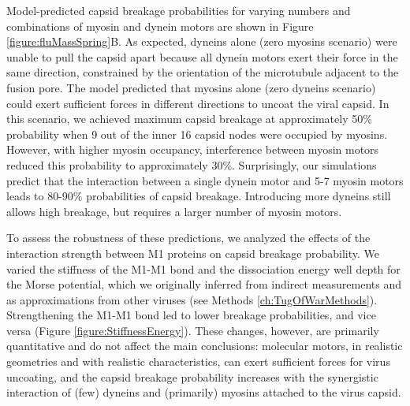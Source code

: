 Model-predicted capsid breakage probabilities for varying numbers and combinations of myosin and dynein motors are shown in Figure \ref{figure:fluMassSpring}B. As expected, dyneins alone (zero myosins scenario) were unable to pull the capsid apart because all dynein motors exert their force in the same direction, constrained by the orientation of the microtubule adjacent to the fusion pore. The model predicted that myosins alone (zero dyneins scenario) could exert sufficient forces in different directions to uncoat the viral capsid. In this scenario, we achieved maximum capsid breakage at approximately 50\% probability when 9 out of the inner 16 capsid nodes were occupied by myosins. However, with higher myosin occupancy, interference between myosin motors reduced this probability to approximately 30\%. Surprisingly, our simulations predict that the interaction between a single dynein motor and 5-7 myosin motors leads to 80-90\% probabilities of capsid breakage. Introducing more dyneins still allows high breakage, but requires a larger number of myosin motors.

To assess the robustness of these predictions, we analyzed the effects of the interaction strength between M1 proteins on capsid breakage probability. We varied the stiffness of the M1-M1 bond and the dissociation energy well depth for the Morse potential, which we originally inferred from indirect measurements and as approximations from other viruses (see Methods \ref{ch:TugOfWarMethods}). Strengthening the M1-M1 bond led to lower breakage probabilities, and vice versa (Figure \ref{figure:StiffnessEnergy}). These changes, however, are primarily quantitative and do not affect the main conclusions: molecular motors, in realistic geometries and with realistic characteristics, can exert sufficient forces for virus uncoating, and the capsid breakage probability increases with the synergistic interaction of (few) dyneins and (primarily) myosins attached to the virus capsid.

